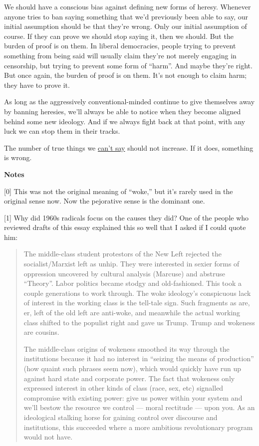 We should have a conscious bias against defining new forms of heresy.
Whenever anyone tries to ban saying something that we'd previously been
able to say, our initial assumption should be that they're wrong. Only
our initial assumption of course. If they can prove we should stop
saying it, then we should. But the burden of proof is on them. In
liberal democracies, people trying to prevent something from being said
will usually claim they're not merely engaging in censorship, but trying
to prevent some form of ``harm''. And maybe they're right. But once
again, the burden of proof is on them. It's not enough to claim harm;
they have to prove it.

As long as the aggressively conventional-minded continue to give
themselves away by banning heresies, we'll always be able to notice when
they become aligned behind some new ideology. And if we always fight
back at that point, with any luck we can stop them in their tracks.

The number of true things we \href{say.html}{can't say} should not
increase. If it does, something is wrong.

\textbf{Notes}

{[}0{]} This was not the original meaning of ``woke,'' but it's rarely
used in the original sense now. Now the pejorative sense is the dominant
one.

{[}1{]} Why did 1960s radicals focus on the causes they did? One of the
people who reviewed drafts of this essay explained this so well that I
asked if I could quote him:

\begin{quote}
The middle-class student protestors of the New Left rejected the
socialist/Marxist left as unhip. They were interested in sexier forms of
oppression uncovered by cultural analysis (Marcuse) and abstruse
``Theory''. Labor politics became stodgy and old-fashioned. This took a
couple generations to work through. The woke ideology's conspicuous lack
of interest in the working class is the tell-tale sign. Such fragments
as are, er, left of the old left are anti-woke, and meanwhile the actual
working class shifted to the populist right and gave us Trump. Trump and
wokeness are cousins.

The middle-class origins of wokeness smoothed its way through the
institutions because it had no interest in ``seizing the means of
production'' (how quaint such phrases seem now), which would quickly
have run up against hard state and corporate power. The fact that
wokeness only expressed interest in other kinds of class (race, sex,
etc) signalled compromise with existing power: give us power within your
system and we'll bestow the resource we control --- moral rectitude ---
upon you. As an ideological stalking horse for gaining control over
discourse and institutions, this succeeded where a more ambitious
revolutionary program would not have.
\end{quote}

